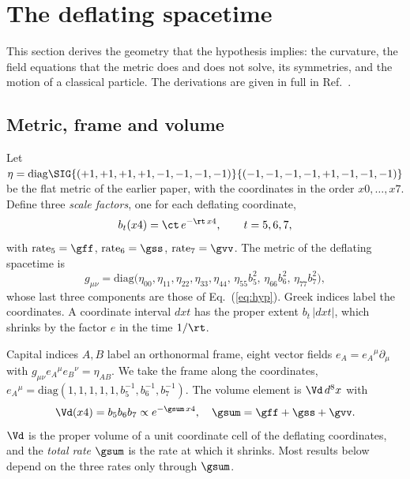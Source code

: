 \section{The deflating spacetime}
\label{sec:geometry}

This section derives the geometry that the hypothesis implies: the curvature, the field equations
that the metric does and does not solve, its symmetries, and the motion of a classical particle. The
derivations are given in full in Ref.~\cite{DeflationRepo}.

\subsection{Metric, frame and volume}

Let $\eta=\mathrm{diag}\SIG{(+1,+1,+1,+1,-1,-1,-1,-1)}{(-1,-1,-1,-1,+1,-1,-1,-1)}$ be the flat metric
of the earlier paper, with the coordinates in the order $x0,\dots,x7$. Define three \emph{scale
factors}, one for each deflating coordinate,
\begin{equation}
b_t(x4)=\ct\,e^{-\rt\,x4},\qquad t=5,6,7,
\label{eq:scale}
\end{equation}
with $\mathrm{rate}_5=\gff$, $\mathrm{rate}_6=\gss$, $\mathrm{rate}_7=\gvv$. The metric of the
deflating spacetime is
\begin{equation}
g_{\mu\nu}=\mathrm{diag}\big(\eta_{00},\eta_{11},\eta_{22},\eta_{33},\eta_{44},\,\eta_{55}b_5^2,\,\eta_{66}b_6^2,\,\eta_{77}b_7^2\big),
\label{eq:metric}
\end{equation}
whose last three components are those of Eq.~(\ref{eq:hyp}). Greek indices label the coordinates. A
coordinate interval $dxt$ has the proper extent $b_t\,|dxt|$, which shrinks by the factor $e$ in the
time $1/\rt$. 

Capital indices $A,B$ label an orthonormal frame, eight vector fields $e_A=e_A{}^{\mu}\partial_\mu$
with $g_{\mu\nu}e_A{}^{\mu}e_B{}^{\nu}=\eta_{AB}$. We take the frame along the coordinates,
$e_A{}^{\mu}=\mathrm{diag}(1,1,1,1,1,b_5^{-1},b_6^{-1},b_7^{-1})$. The volume element is $\Vd\,d^8x$
with
\begin{equation}
\Vd(x4)=b_5b_6b_7\propto e^{-\gsum\,x4},\quad\gsum=\gff+\gss+\gvv .
\label{eq:Vd}
\end{equation}
$\Vd$ is the proper volume of a unit coordinate cell of the deflating coordinates, and the
\emph{total rate} $\gsum$ is the rate at which it shrinks. Most results below depend on the three
rates only through $\gsum$.

